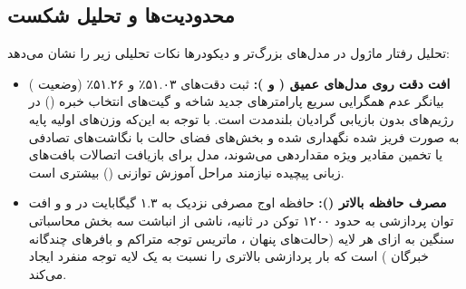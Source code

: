 \subsection{محدودیت‌ها و تحلیل شکست}
تحلیل رفتار ماژول در مدل‌های بزرگ‌تر و دیکودرها نکات تحلیلی زیر را نشان می‌دهد:
\begin{itemize}
    \item \textbf{افت دقت روی مدل‌های عمیق ( و ):} ثبت دقت‌های ۵۱.۰۳٪ و ۵۱.۲۶٪ (وضعیت ) بیانگر عدم همگرایی سریع پارامترهای جدید شاخه  و گیت‌های انتخاب خبره () در رژیم‌های بدون بازیابی گرادیان بلندمدت است. با توجه به این‌که وزن‌های اولیه پایه به صورت فریز شده نگهداری شده و بخش‌های فضای حالت با نگاشت‌های تصادفی یا تخمین مقادیر ویژه مقداردهی می‌شوند، مدل برای بازیافت اتصالات بافت‌های زبانی پیچیده نیازمند مراحل آموزش توازنی () بیشتری است.
    \item \textbf{مصرف حافظه بالاتر ():} حافظه اوج مصرفی نزدیک به ۱.۳ گیگابایت در  و  و افت توان پردازشی به حدود ۱۲۰۰ توکن در ثانیه، ناشی از انباشت سه بخش محاسباتی سنگین به ازای هر لایه (حالت‌های پنهان ، ماتریس توجه متراکم و بافرهای چندگانه خبرگان ) است که بار پردازشی بالاتری را نسبت به یک لایه توجه منفرد ایجاد می‌کند.
\end{itemize}

